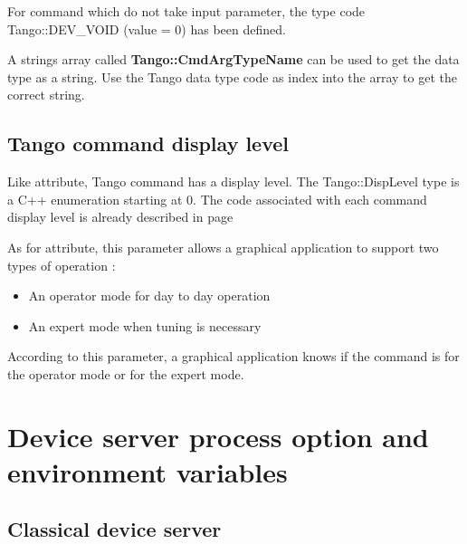 \vspace{0.3cm}


For command which do not take input parameter, the type code Tango::DEV\_VOID
(value = 0) has been defined.

A strings array called \textbf{Tango::CmdArgTypeName}
can be used to get the data type as a string. Use the Tango data type
code as index into the array to get the correct string.


\subsection{Tango command display level}

Like attribute, Tango command has a display level. The Tango::DispLevel
type is a C++ enumeration starting at 0. The code associated with
each command display level is already described in page \pageref{display level}

As for attribute, this parameter allows a graphical application to
support two types of operation :
\begin{itemize}
\item An operator mode for day to day operation
\item An expert mode when tuning is necessary
\end{itemize}
According to this parameter, a graphical application knows if the
command is for the operator mode or for the expert mode.


\section{Device server process option and environment variables}


\subsection{Classical device server}

